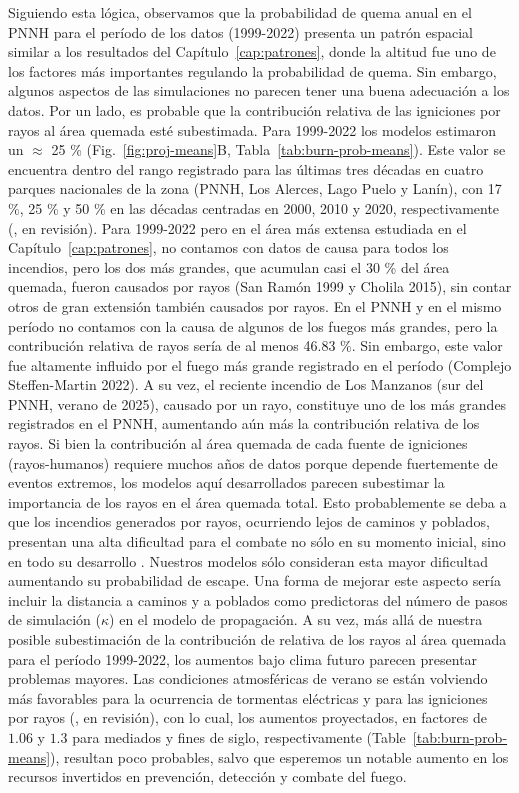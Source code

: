 Siguiendo esta lógica, observamos que la probabilidad de quema anual en el PNNH para el período de los datos (1999-2022) presenta un patrón espacial similar a los resultados del Capítulo~\ref{cap:patrones}, donde la altitud fue uno de los factores más importantes regulando la probabilidad de quema. Sin embargo, algunos aspectos de las simulaciones no parecen tener una buena adecuación a los datos. Por un lado, es probable que la contribución relativa de las igniciones por rayos al área quemada esté subestimada. Para 1999-2022 los modelos estimaron un $\approx$ 25 \% (Fig.~\ref{fig:proj-means}B, Tabla~\ref{tab:burn-prob-means}). Este valor se encuentra dentro del rango registrado para las últimas tres décadas en cuatro parques nacionales de la zona (PNNH, Los Alerces, Lago Puelo y Lanín), con 17 \%, 25 \% y 50 \% en las décadas centradas en 2000, 2010 y 2020, respectivamente (\citeauthor{kitzbergerLightning}, en revisión). Para 1999-2022 pero en el área más extensa estudiada en el Capítulo~\ref{cap:patrones}, no contamos con datos de causa para todos los incendios, pero los dos más grandes, que acumulan casi el 30 \% del área quemada, fueron causados por rayos (San Ramón 1999 y Cholila 2015), sin contar otros de gran extensión también causados por rayos. En el PNNH y en el mismo período no contamos con la causa de algunos de los fuegos más grandes, pero la contribución relativa de rayos sería de al menos 46.83 \%. Sin embargo, este valor fue altamente influido por el fuego más grande registrado en el período (Complejo Steffen-Martin 2022). A su vez, el reciente incendio de Los Manzanos (sur del PNNH, verano de 2025), causado por un rayo, constituye uno de los más grandes registrados en el PNNH, aumentando aún más la contribución relativa de los rayos. Si bien la contribución al área quemada de cada fuente de igniciones (rayos-humanos) requiere muchos años de datos porque depende fuertemente de eventos extremos, los modelos aquí desarrollados parecen subestimar la importancia de los rayos en el área quemada total. Esto probablemente se deba a que los incendios generados por rayos, ocurriendo lejos de caminos y poblados, presentan una alta dificultad para el combate no sólo en su momento inicial, sino en todo su desarrollo \citep{thompson2021forest,kolkos2025evaluation}. Nuestros modelos sólo consideran esta mayor dificultad aumentando su probabilidad de escape. Una forma de mejorar este aspecto sería incluir la distancia a caminos y a poblados como predictoras del número de pasos de simulación ($\kappa$) en el modelo de propagación. A su vez, más allá de nuestra posible subestimación de la contribución de relativa de los rayos al área quemada para el período 1999-2022, los aumentos bajo clima futuro parecen presentar problemas mayores. Las condiciones atmosféricas de verano se están volviendo más favorables para la ocurrencia de tormentas eléctricas y para las igniciones por rayos (\citeauthor{kitzbergerLightning}, en revisión), con lo cual, los aumentos proyectados, en factores de $1.06$ y $1.3$ para mediados y fines de siglo, respectivamente (Table~\ref{tab:burn-prob-means}), resultan poco probables, salvo que esperemos un notable aumento en los recursos invertidos en prevención, detección y combate del fuego.

